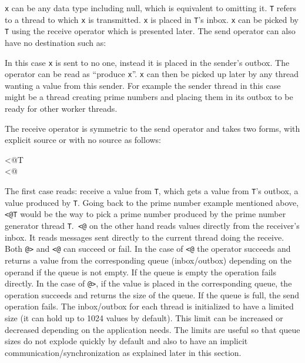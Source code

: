 
\noindent
\texttt{x} can be any data type including null, which is equivalent to
omitting it. \texttt{T} refers to a thread to which \texttt{x} is
transmitted. \texttt{x} is placed in \texttt{T}'s inbox. \texttt{x} can be
picked by \texttt{T} using the receive operator which is presented
later. The send operator can also have no destination such as:


\noindent
In this case \texttt{x} is sent to no one, instead it is placed in the
sender's outbox.  The operator can be read as ``produce \texttt{x}''.
\texttt{x} can then be picked up later by any thread wanting a value from
this sender. For example the sender thread in this case might be a thread
creating prime numbers and placing them in its outbox to be ready for other
worker threads.

The receive operator is symmetric to the send operator and takes two forms, with
explicit source or with no source as follows:

\begin{iconcode}
<@T\\
<@\\
\end{iconcode}

The first case reads: receive a value from \texttt{T}, which gets a value
from \texttt{T}'s outbox, a value produced by \texttt{T}. Going back to the
prime number example mentioned above, \texttt{<@T} would be the way to pick
a prime number produced by the prime number generator thread
\texttt{T}.\texttt{ <@} on the other hand reads values directly from the
receiver's inbox.  It reads messages sent directly to the current thread
doing the receive.  Both \texttt{@>} and \texttt{<@} can succeed or
fail. In the case of \texttt{<@} the operator succeeds and returns a value
from the corresponding queue (inbox/outbox) depending on the operand if the
queue is not empty. If the queue is empty the operation fails directly.  In
the case of \texttt{@>}, if the value is placed in the corresponding queue,
the operation succeeds and returns the size of the queue. If the queue is
full, the send operation fails. The inbox/outbox for each thread is
initialized to have a limited size (it can hold up to 1024 values by
default). This limit can be increased or decreased depending on the
application needs. The limits are useful so that queue sizes do not explode
quickly by default and also to have an implicit
communication/synchronization as explained later in this section.

